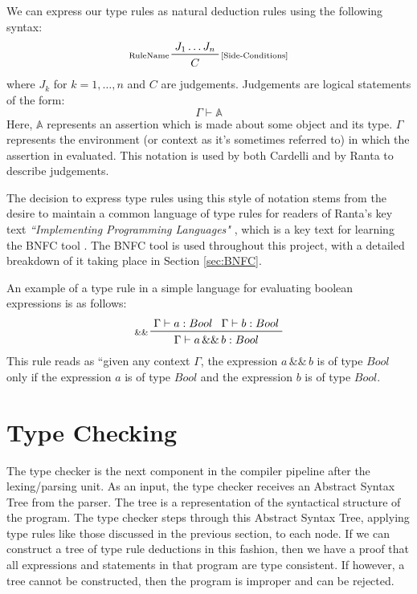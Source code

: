 \documentclass{UoYCSproject}
\begin{document}
We can express our type rules as natural deduction rules using the following
syntax:
\begin{displaymath}
    \prftree[l,r]{\scriptsize [Side-Conditions]}{\scriptsize RuleName}{J_1 \dots J_n}{C}
\end{displaymath}
where $J_k$ for $k=1, \dots ,n$ and $C$ are judgements. Judgements are logical 
statements of the form:
\begin{displaymath}
    \Gamma \vdash \mathbb{A}
\end{displaymath}
Here, $\mathbb{A}$ represents an assertion which is made about some object and
its type. $\Gamma$ represents the environment (or context as it's sometimes
referred to) in which the assertion in evaluated. This notation is used by both
Cardelli \cite[p.~8]{CSHandbook} and by Ranta \cite[\S4.4, p.~60]{Ranta} to 
describe judgements.

The decision to express type rules using this style of notation stems from the 
desire to maintain a common language of type rules for readers of Ranta's key
text \textit{``Implementing Programming Languages"} \cite{Ranta}, which is a key 
text for learning the BNFC tool \cite{BNFC}. The BNFC tool is used throughout
this project, with a detailed breakdown of it taking place in Section 
\ref{sec:BNFC}. 

An example of a type rule in a simple language for evaluating boolean 
expressions is as follows:
\begin{displaymath}
    \prftree[l]{\scriptsize \&\&}{\Gamma \vdash a:Bool}{\Gamma \vdash b:Bool}{\Gamma \vdash a \, \&\& \, b: Bool}
\end{displaymath}
This rule reads as ``given any context $\Gamma$, the expression $a \, \&\& \, b$
is of type $Bool$ only if the expression $a$ is of type $Bool$ and the expression $b$
is of type $Bool$.

\section{Type Checking}
\label{sec:Chap1TypeChecking}
The type checker is the next component in the compiler pipeline after the
lexing/parsing unit. As an input, the type checker receives an Abstract Syntax
Tree from the parser. The tree is a representation of the syntactical structure
of the program. The type checker steps through this Abstract Syntax Tree, applying
type rules like those discussed in the previous section, to each node. If we
can construct a tree of type rule deductions in this fashion, then we have a
proof that all expressions and statements in that program are type consistent.
If however, a tree cannot be constructed, then the program is improper and
can be rejected.
\end{document}
